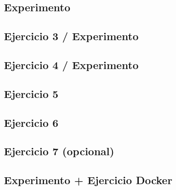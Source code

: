 \subsection{Experimento}

\subsection{Ejercicio 3 / Experimento}

\subsection{Ejercicio 4 / Experimento}

\subsection{Ejercicio 5}

\subsection{Ejercicio 6}

\subsection{Ejercicio 7 (opcional)}

\subsection{Experimento + Ejercicio Docker}
